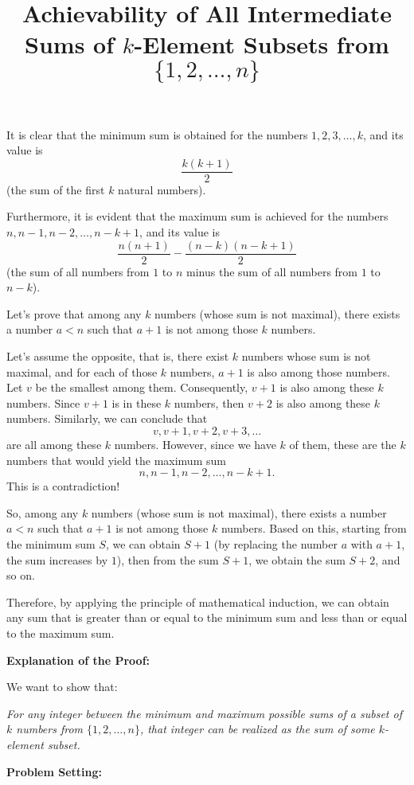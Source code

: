 \documentclass[12pt]{article}
\title{Achievability of All Intermediate Sums of $k$-Element Subsets from $\{1, 2, \dots, n\}$}
\author{}
\date{}
\begin{document}
\maketitle

It is clear that the minimum sum is obtained for the numbers $1,2,3,\dots,k$, and its value is 
$$\frac{k(k+1)}{2}$$
(the sum of the first $k$ natural numbers).

Furthermore, it is evident that the maximum sum is achieved for the numbers $n, n-1, n-2, \dots, n-k+1$, and its value is 
$$\frac{n(n+1)}{2} - \frac{(n-k)(n-k+1)}{2}$$
(the sum of all numbers from $1$ to $n$ minus the sum of all numbers from $1$ to $n-k$).

Let's prove that among any $k$ numbers (whose sum is not maximal), there exists a number $a < n$ such that $a+1$ is not among those $k$ numbers.

Let's assume the opposite, that is, there exist $k$ numbers whose sum is not maximal, and for each of those $k$ numbers, $a+1$ is also among those numbers. Let $v$ be the smallest among them. Consequently, $v+1$ is also among these $k$ numbers. Since $v+1$ is in these $k$ numbers, then $v+2$ is also among these $k$ numbers. Similarly, we can conclude that 
$$v, v+1, v+2, v+3, \dots$$
are all among these $k$ numbers. However, since we have $k$ of them, these are the $k$ numbers that would yield the maximum sum 
$$n, n-1, n-2, \dots, n-k+1.$$
This is a contradiction!

So, among any $k$ numbers (whose sum is not maximal), there exists a number $a < n$ such that $a+1$ is not among those $k$ numbers. Based on this, starting from the minimum sum $S$, we can obtain $S+1$ (by replacing the number $a$ with $a+1$, the sum increases by $1$), then from the sum $S+1$, we obtain the sum $S+2$, and so on.

Therefore, by applying the principle of mathematical induction, we can obtain any sum that is greater than or equal to the minimum sum and less than or equal to the maximum sum.

\bigskip

\textbf{Explanation of the Proof:}

We want to show that:

\textit{For any integer between the minimum and maximum possible sums of a subset of $k$ numbers from $\{1, 2, \dots, n\}$, that integer can be realized as the sum of some $k$-element subset.}

\bigskip

\textbf{Problem Setting:}
\end{document}
